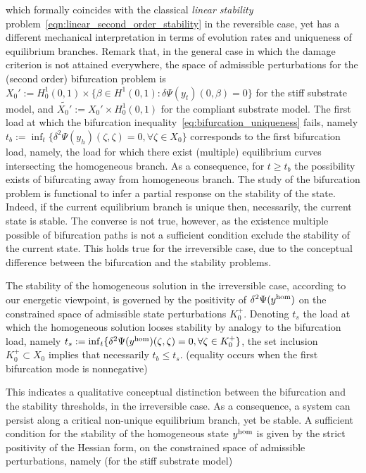 which formally coincides with the classical \emph{linear stability} problem~\eqref{eqn:linear_second_order_stability} in the reversible case, yet has a different mechanical interpretation in terms of evolution rates and uniqueness of equilibrium branches.
Remark that, in the general case in which the damage criterion is not attained everywhere, the space of admissible perturbations for the (second order) bifurcation problem is $X_0':=H^1_0(0, 1) \times \{ \beta \in H^1(0, 1) : \delta\Psi(y_t)(0, \beta) = 0 \}$ for the stiff substrate model, and $\widetilde{X_0'}:=X_0'\times H^1_0(0,1)$ for the compliant substrate model. 
The first load at which the bifurcation inequality~\eqref{eq:bifurcation_uniqueness} fails, namely $t_b:=\inf_t \{\delta^2 \Psi(y_h)(\zeta, \zeta) =0, \forall \zeta \in X_0 \}$ corresponds to the first  bifurcation load, namely, the load for which there exist (multiple) equilibrium curves intersecting the homogeneous branch. As a consequence, for $t\geq t_b$  the possibility exists of bifurcating away from homogeneous branch. The study of the bifurcation problem is functional to infer a partial response on the stability of the state. Indeed, if the current equilibrium branch is unique then, necessarily, the current state is stable. The converse is not true, however, as the existence multiple possible of bifurcation paths is not a sufficient condition exclude the stability of the current state. This holds true for the irreversible case, due to the conceptual difference between the bifurcation and the stability problems.

The stability of the homogeneous solution in the irreversible case, according to our energetic viewpoint, is governed by the positivity of $\delta^2 \Psi(y^{\text{hom}})$ on the constrained space of admissible state perturbations $K^+_0$.
Denoting $t_s$ the load at which the homogeneous solution looses stability by analogy to the bifurcation load, namely $t_s: = \inf_t \{\delta^2 \Psi(y^{\text{hom}})(\zeta, \zeta) =0, \forall \zeta \in K^+_0 \}$, the set inclusion $K^+_0 \subset X_0$ implies that necessarily $t_b \leq t_s$. (equality occurs when the first bifurcation mode is nonnegative)

This indicates a qualitative conceptual distinction between the bifurcation and the stability thresholds, in the irreversible case. As a consequence, a system can persist along a critical non-unique equilibrium branch, yet be stable. 
A sufficient condition for the stability of the homogeneous state $y^{\text{hom}}$ is given by the strict positivity  of the Hessian form, on the constrained space of admissible perturbations, namely (for the stiff substrate model)

